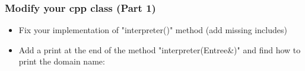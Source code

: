 \documentclass[10pt, hyperref={unicode=true,pdfusetitle, bookmarks=true,bookmarksnumbered=false,bookmarksopen=false, breaklinks=false,pdfborder={0 0 1},backref=true,colorlinks=true,linkcolor=darkblue,pageanchor, urlcolor=darkblue}]{beamer}
\begin{document}
\begin{frame}
\frametitle{Modify your cpp class (Part 1)}
\begin{block}{}

\begin{itemize}


\item Fix your implementation of "interpreter()" method (add missing includes)
\item Add a print at the end of the method
"interpreter(Entree\&)" and find how to print the domain name:
\begin{center}
\end{center}
\end{itemize}

\end{block}
\end{frame}
\end{document}
